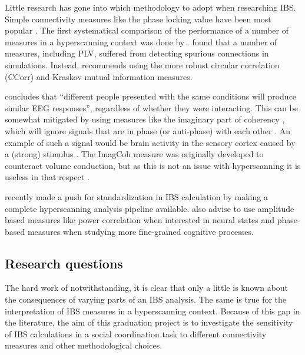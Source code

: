 Little research has gone into which methodology to adopt when researching
IBS. Simple connectivity measures like the phase locking value
\parencite[PLV;][]{lachaux_measuring_1999} have been most popular
\parencite{czeszumski_hyperscanning_2020,burgess_interpretation_2013}.
The first systematical comparison of the performance of a number of
measures in a hyperscanning context was done by
\textcite{burgess_interpretation_2013}. \citeauthor{burgess_interpretation_2013}
found that a number of measures, including PLV, suffered from detecting
spurious connections in simulations. Instead,
\citeauthor{burgess_interpretation_2013} recommends using the more robust
circular correlation (CCorr) and Kraskov mutual information measures.

\textcite{burgess_interpretation_2013} concludes that ``different people
presented with the same conditions will produce similar EEG responses'',
regardless of whether they were interacting. This can be somewhat mitigated by
using measures like the imaginary part of coherency
\parencite[ImagCoh;][]{nolte_identifying_2004,yoshinaga_comparison_2020},
which will ignore signals that are in phase (or anti-phase) with each other
\parencite[p.~346]{cohen_analyzing_2014}. An example of such a signal would be
brain activity in the sensory cortex caused by a (strong) stimulus
\parencite{dikker_crowdsourcing_2021}. The ImagCoh measure
was originally developed to counteract volume conduction, but as this is not an
issue with hyperscanning it is useless in that respect
\parencite{ayrolles_hypyp_2021}.

\textcite{ayrolles_hypyp_2021} recently made a push for standardization in IBS
calculation by making a complete hyperscanning analysis pipeline available.
\citeauthor{ayrolles_hypyp_2021} also advise to use amplitude based measures
like power correlation when interested in neural states and phase-based measures
when studying more fine-grained cognitive processes.

\subsection{Research questions}

The hard work of \textcite{burgess_interpretation_2013,ayrolles_hypyp_2021}
notwithstanding, it is clear that only a little is known about the consequences
of varying parts of an IBS analysis. The same is true for the
interpretation of IBS measures in a hyperscanning context. Because of this gap
in the literature, the aim of this graduation project is to investigate the
sensitivity of IBS calculations in a social coordination task to different
connectivity measures and other methodological choices.

